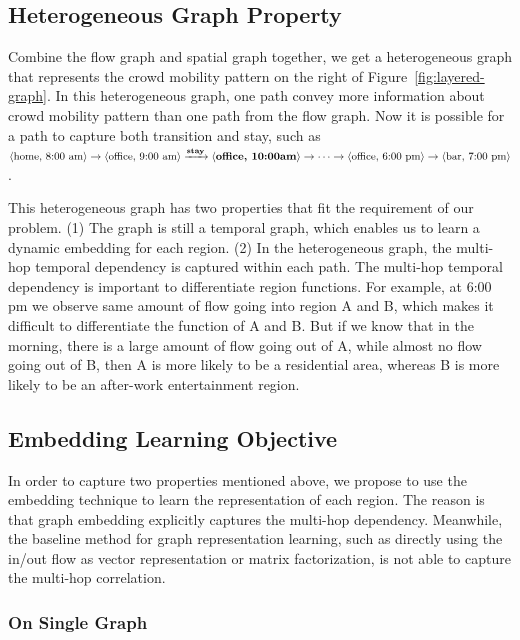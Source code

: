 \subsection{Heterogeneous Graph Property}

Combine the flow graph and spatial graph together, we get a heterogeneous graph that represents the crowd mobility pattern on the right of Figure~\ref{fig:layered-graph}. In this heterogeneous graph, one path convey more information about crowd mobility pattern than one path from the flow graph. Now it is possible for a path to capture both transition and stay, such as $\langle \text{home, 8:00 am} \rangle \rightarrow \langle \text{office, 9:00 am} \rangle \xrightarrow{\text{\bf stay}} \langle \text{\bf office, 10:00am} \rangle \rightarrow \cdots \rightarrow \langle \text{office, 6:00 pm} \rangle \rightarrow \langle \text{bar, 7:00 pm} \rangle $.

This heterogeneous graph has two properties that fit the requirement of our problem. (1) The graph is still a temporal graph, which enables us to learn a dynamic embedding for each region. (2) In the heterogeneous graph, the multi-hop temporal dependency is captured within each path. The multi-hop temporal dependency is important to differentiate region functions. For example, at 6:00 pm we observe same amount of flow going into region A and B, which makes it difficult to differentiate the function of A and B. But if we know that in the morning, there is a large amount of flow going out of A, while almost no flow going out of B, then A is more likely to be a residential area, whereas B is more likely to be an after-work entertainment region.




\subsection{Embedding Learning Objective}

In order to capture two properties mentioned above, we propose to use the embedding technique to learn the representation of each region. The reason is that graph embedding explicitly captures the multi-hop dependency. Meanwhile, the baseline method for graph representation learning, such as directly using the in/out flow as vector representation or matrix factorization,  is not able to capture the multi-hop correlation.

\subsubsection{On Single Graph}

